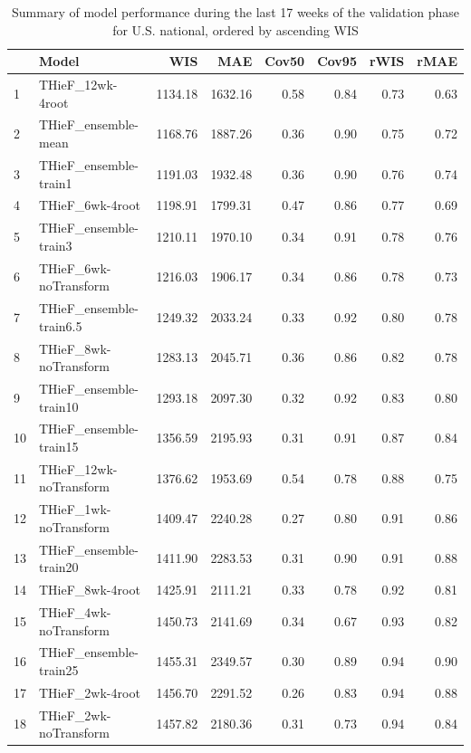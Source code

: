 \documentclass[12pt]{article}
\begin{document}
\begingroup\renewcommand{\arraystretch}{0.75}
\begin{longtable}{llrrrrrr}
\caption{Summary of model performance during the last 17 weeks of the validation phase for U.S. national, ordered by ascending WIS} \\ 
  \hline
 & Model & WIS & MAE & Cov50 & Cov95 & rWIS & rMAE \\ 
  \hline
1 & THieF\_12wk-4root & 1134.18 & 1632.16 & 0.58 & 0.84 & 0.73 & 0.63 \\ 
  2 & THieF\_ensemble-mean & 1168.76 & 1887.26 & 0.36 & 0.90 & 0.75 & 0.72 \\ 
  3 & THieF\_ensemble-train1 & 1191.03 & 1932.48 & 0.36 & 0.90 & 0.76 & 0.74 \\ 
  4 & THieF\_6wk-4root & 1198.91 & 1799.31 & 0.47 & 0.86 & 0.77 & 0.69 \\ 
  5 & THieF\_ensemble-train3 & 1210.11 & 1970.10 & 0.34 & 0.91 & 0.78 & 0.76 \\ 
  6 & THieF\_6wk-noTransform & 1216.03 & 1906.17 & 0.34 & 0.86 & 0.78 & 0.73 \\ 
  7 & THieF\_ensemble-train6.5 & 1249.32 & 2033.24 & 0.33 & 0.92 & 0.80 & 0.78 \\ 
  8 & THieF\_8wk-noTransform & 1283.13 & 2045.71 & 0.36 & 0.86 & 0.82 & 0.78 \\ 
  9 & THieF\_ensemble-train10 & 1293.18 & 2097.30 & 0.32 & 0.92 & 0.83 & 0.80 \\ 
  10 & THieF\_ensemble-train15 & 1356.59 & 2195.93 & 0.31 & 0.91 & 0.87 & 0.84 \\ 
  11 & THieF\_12wk-noTransform & 1376.62 & 1953.69 & 0.54 & 0.78 & 0.88 & 0.75 \\ 
  12 & THieF\_1wk-noTransform & 1409.47 & 2240.28 & 0.27 & 0.80 & 0.91 & 0.86 \\ 
  13 & THieF\_ensemble-train20 & 1411.90 & 2283.53 & 0.31 & 0.90 & 0.91 & 0.88 \\ 
  14 & THieF\_8wk-4root & 1425.91 & 2111.21 & 0.33 & 0.78 & 0.92 & 0.81 \\ 
  15 & THieF\_4wk-noTransform & 1450.73 & 2141.69 & 0.34 & 0.67 & 0.93 & 0.82 \\ 
  16 & THieF\_ensemble-train25 & 1455.31 & 2349.57 & 0.30 & 0.89 & 0.94 & 0.90 \\ 
  17 & THieF\_2wk-4root & 1456.70 & 2291.52 & 0.26 & 0.83 & 0.94 & 0.88 \\ 
  18 & THieF\_2wk-noTransform & 1457.82 & 2180.36 & 0.31 & 0.73 & 0.94 & 0.84 \\ 

\end{longtable}
\end{document}
